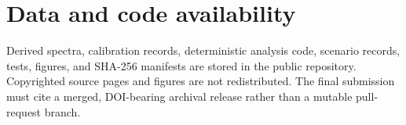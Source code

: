 \section{Data and code availability}\label{data-and-code-availability}

Derived spectra, calibration records, deterministic analysis code,
scenario records, tests, figures, and SHA-256 manifests are stored in
the public repository. Copyrighted source pages and figures are not
redistributed. The final submission must cite a merged, DOI-bearing
archival release rather than a mutable pull-request branch.
